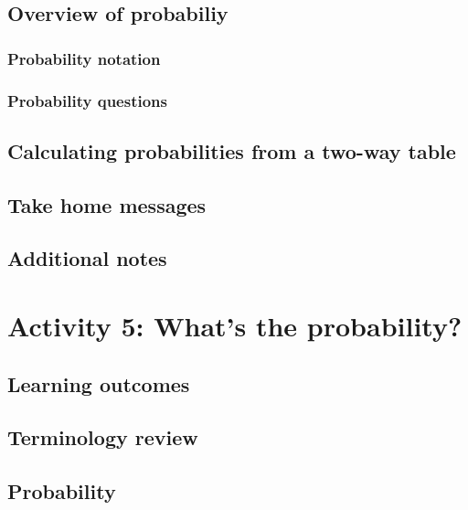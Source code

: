 \documentclass[
]{report}
\begin{document}
\subsection{Overview of probabiliy}\label{overview-of-probabiliy}

\subsubsection*{Probability notation}\label{probability-notation}

\subsubsection{Probability questions}\label{probability-questions}

\subsection{Calculating probabilities from a two-way table}\label{calculating-probabilities-from-a-two-way-table}

\subsection{Take home messages}\label{take-home-messages-3}

\subsection{Additional notes}\label{additional-notes-3}

\section{Activity 5: What's the probability?}\label{activity-5-whats-the-probability}

\subsection{Learning outcomes}\label{learning-outcomes-4}

\subsection{Terminology review}\label{terminology-review-4}

\subsection{Probability}\label{probability-2}
\end{document}
